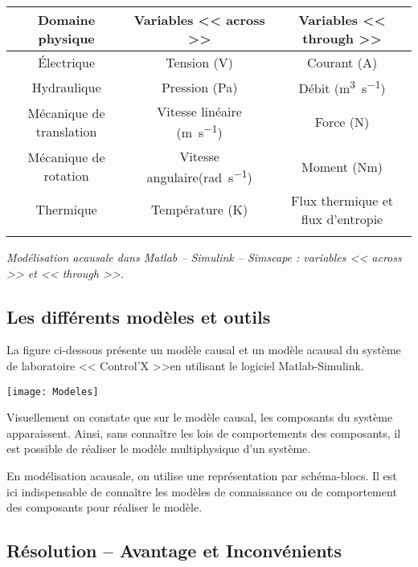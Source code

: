 \begin{center}
\begin{tabular}{ccc}
\hline
Domaine physique & Variables << across >> &  Variables << through >> \\ \hline\hline
Électrique & Tension (\si{V})& Courant (\si{A})\\ \hline
Hydraulique & Pression (\si{Pa})& Débit (\si{m^3.s^{-1}})\\ \hline
Mécanique de translation & Vitesse linéaire (\si{m.s^{-1}})& Force (\si{N})\\ \hline 
Mécanique de rotation & Vitesse angulaire(\si{rad.s^{-1}}) & Moment (\si{Nm})\\ \hline
Thermique & Température (K)& Flux thermique et flux d'entropie \\ \hline
\\
\end{tabular}

\textit{Modélisation acausale dans Matlab -- Simulink -- Simscape : variables << across >> et << through >>.}
\end{center}

\subsection{Les différents modèles et outils}

La figure ci-dessous présente un modèle causal et un modèle acausal du système de laboratoire << Control'X >>en utilisant le logiciel Matlab-Simulink.

\begin{center}
\texttt{[image: Modeles]}
\end{center}

Visuellement on constate que sur le modèle causal, les composants du système apparaissent. Ainsi, sans connaître les lois de comportements des composants, il est possible de réaliser le modèle multiphysique d'un système.

En modélisation acausale, on utilise une représentation par schéma-blocs. Il est ici indispensable de connaître les modèles de connaissance ou de comportement des composants pour réaliser le modèle.

\subsection{Résolution -- Avantage et Inconvénients}

